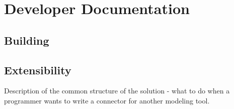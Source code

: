 \chapter{Developer Documentation}

\section{Building}

\section{Extensibility}

Description of the common structure of the solution - what to do when a programmer wants to write a connector for another modeling tool.
